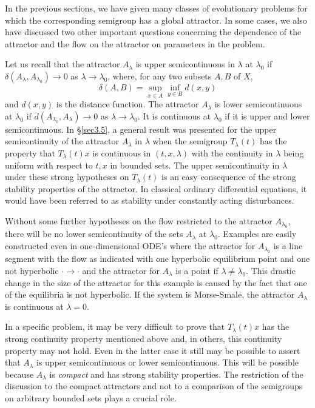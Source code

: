 \documentclass{surv-l}
\theoremstyle{plain}
\theoremstyle{definition}
\numberwithin{equation}{section}
\numberwithin{figure}{chapter}
\begin{document}
In the previous sections, we have given many classes of evolutionary problems for which the corresponding semigroup has a global attractor. In some cases, we also have discussed two other important questions concerning the dependence of the attractor and the flow on the attractor on parameters in the problem.

Let us recall that the attractor $A_{\lambda}$ is upper semicontinuous in $\lambda$ at $\lambda_{0}$ if $\delta(A_{\lambda}, A_{\lambda_{0}})\rightarrow 0$ as $\lambda \rightarrow\lambda_{0}$, where, for any two subsets $A, B$ of $X$,
\begin{equation*}
\delta(A, B)=\sup_{x\in A}\inf_{y\in B}d(x, y)
\end{equation*}
and $d(x, y)$ is the distance function. The attractor $A_{\lambda}$ is lower semicontinuous at $\lambda_{0}$ if $d(A_{\lambda_{0}}, A_{\lambda})\rightarrow 0$ as $\lambda\rightarrow\lambda_{0}$. It is continuous at $\lambda_{0}$ if it is upper and lower semicontinuous. In \S \ref{sec3.5}, a general result was presented for the upper semicontinuity of the attractor $A_{\lambda}$ in $\lambda$ when the semigroup $T_{\lambda}(t)$ has the property that $T_{\lambda}(t)x$ is continuous in $(t, x, \lambda)$ with the continuity in $\lambda$ being uniform with respect to $t, x$ in bounded sets. The upper semicontinuity in $\lambda$ under these strong hypotheses on $T_{\lambda}(t)$ is an easy consequence of the strong stability properties of the attractor. In classical ordinary differential equations, it would have been referred to as stability under constantly acting disturbances.

Without some further hypotheses on the flow restricted to the attractor $A_{\lambda_{0}}$, there will be no lower semicontinuity of the sets $A_{\lambda}$ at $\lambda_{0}$. Examples are easily constructed even in one-dimensional ODE's where the attractor for $A_{\lambda_{0}}$ is a line segment with the flow as indicated with one hyperbolic equilibrium point and one not hyperbolic $\cdot\rightarrow\cdot$ and the attractor for $A_{\lambda}$ is a point if $\lambda \neq\lambda_{0}$. This drastic change in the size of the attractor for this example is caused by the fact that one of the equilibria is not hyperbolic. If the system is Morse-Smale, the attractor $A_{\lambda}$ is continuous at $\lambda=0$.

In a specific problem, it may be very difficult to prove that $T_{\lambda}(t)x$ has the strong continuity property mentioned above and, in others, this continuity property may not hold. Even in the latter case it still may be possible to assert that $A_{\lambda}$ is upper semicontinuous or lower semicontinuous. This will be possible because $A_{\lambda}$ is \emph{compact} and has strong stability properties. The restriction of the discussion to the compact attractors and not to a comparison of the semigroups on arbitrary bounded sets plays a crucial role.
\end{document}
